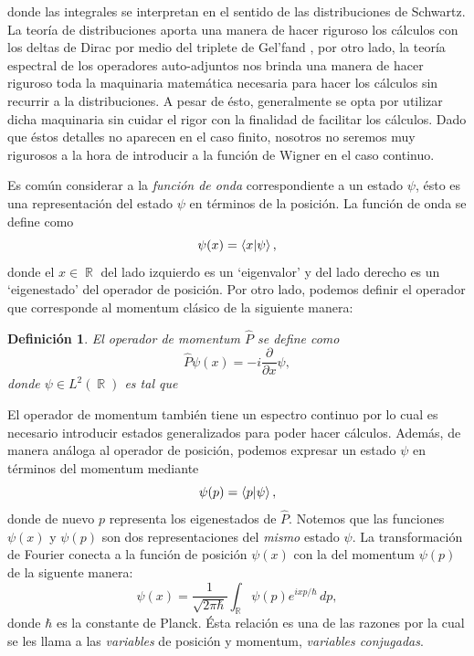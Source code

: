 \documentclass[a4paper]{report}
\DeclareMathOperator{\R}{\mathbb{R}}
\newtheorem{definition}{Definición}
\begin{document}
  donde las integrales se interpretan en el sentido de las
  distribuciones de Schwartz. La teoría de distribuciones
  aporta una manera de hacer riguroso los cálculos con los
  deltas de Dirac por medio del triplete de Gel'fand
  \cite{folland1989}, por otro lado, la teoría espectral de
  los operadores auto-adjuntos nos brinda una manera de
  hacer riguroso toda la maquinaria matemática necesaria
  para hacer los cálculos sin recurrir a la distribuciones.
  A pesar de ésto, generalmente se opta por utilizar dicha
  maquinaria sin cuidar el rigor con la finalidad de
  facilitar los cálculos. Dado que éstos detalles no
  aparecen en el caso finito, nosotros no seremos muy
  rigurosos a la hora de introducir a la función de Wigner
  en el caso continuo.

  Es común considerar a la \textit{función de onda}
  correspondiente a un estado $\psi$, ésto es una
  representación del estado $\psi$ en términos de la
  posición. La función de onda se define como
  \[
    \psi(x)
    = \braket{x| \psi},
  \] 
  donde el $x \in \R$ del lado izquierdo es un `eigenvalor'
  y del lado derecho es un `eigenestado' del operador de
  posición. Por otro lado, podemos definir el operador que
  corresponde al momentum clásico de la siguiente manera:
  \begin{definition}
    El operador de momentum $\hat P$ se define como
    \[
      \hat P\psi(x) = -i \frac{\partial}{\partial x} \psi,
    \] 
    donde $\psi \in L^2(\R)$ es tal que
  \end{definition}
  El operador de momentum también tiene un espectro continuo
  por lo cual es necesario introducir estados generalizados
  para poder hacer cálculos. Además, de manera análoga al
  operador de posición, podemos expresar un estado $\psi$ en
  términos del momentum mediante
  \[
    \psi(p) = \braket{p| \psi},
  \] 
  donde de nuevo $p$ representa los eigenestados de $\hat
  P$. Notemos que las funciones $\psi(x)$ y $\psi(p)$ son
  dos representaciones del \textit{mismo} estado $\psi$.  La
  transformación de Fourier conecta a la función de posición
  $\psi(x)$ con la del momentum $\psi(p)$ de la siguente
  manera:
  \begin{equation}
    \psi(x)
    = \frac{1}{\sqrt{2\pi\hbar}} \int_{\R} \psi(p)e^{ixp /
    \hbar} \, dp,
  \end{equation} 
  donde $\hbar$ es la constante de Planck. Ésta relación es
  una de las razones por la cual se les llama a las
  \textit{variables} de posición y momentum,
  \textit{variables conjugadas}.
\end{document}
